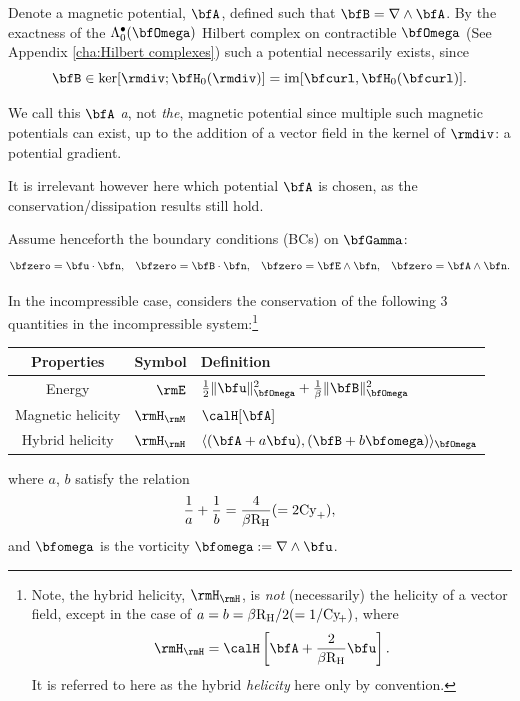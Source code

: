     Denote a magnetic potential, $\bfA$, defined such that $\bfB  =  \nabla\wedge\bfA$. By the exactness of the $\Lambda_{0}^{\bullet}(\bfOmega)$ Hilbert complex on contractible $\bfOmega$ (See Appendix \ref{cha:Hilbert complexes}) such a potential necessarily exists, since
    \begin{equation}
        \bfB  \in  \ker[\rmdiv; \bfH_{0}(\rmdiv)]  =  \im[\bfcurl, \bfH_{0}(\bfcurl)].
    \end{equation}
    
    \begin{remark}
        We call this $\bfA$ \emph{a}, not \emph{the}, magnetic potential since multiple such magnetic potentials can exist, up to the addition of a vector field in the kernel of $\rmdiv$: a potential gradient.
        
        It is irrelevant however here which potential $\bfA$ is chosen, as the conservation/dissipation results still hold.
    \end{remark}

    Assume henceforth the boundary conditions (BCs) on $\bfGamma$: 
    \begin{align}\label{eqn:canonical boundary conditions}
        \bfzero  =  \bfu\cdot\bfn,   &&
        \bfzero  =  \bfB\cdot\bfn,   &&
        \bfzero  =  \bfE\wedge\bfn,  &&
        \bfzero  =  \bfA\wedge\bfn.
    \end{align}

    In the incompressible case, \cite{Laakmann_Hu_Farrell_2022} considers the conservation of the following 3 quantities in the incompressible system:\footnote{Note, the hybrid helicity, $\rmH_{\rmH}$, is \emph{not} (necessarily) the helicity of a vector field, except in the case of $a = b = \beta\mathrm{R}_{\mathrm{H}}/2 (= 1/\mathrm{Cy}\!_{+})$, where
    \begin{equation}
        \rmH_{\rmH} = \calH\left[\bfA + \frac{2}{\beta\rmRH}\bfu\right].
    \end{equation}
    It is referred to here as the hybrid \emph{helicity} here only by convention.}
    \begin{center}\begin{tabular}{ c | r : l }
        Properties  &  Symbol  &  Definition  \\
        \hline\hline
        Energy  &  $\rmE$  &  $\frac{1}{2}\|\bfu\|_{\bfOmega}^{2} + \frac{1}{\beta}\|\bfB\|_{\bfOmega}^{2}$  \\
        \hdashline
        Magnetic helicity \cite{Blackman_2015}  &  $\rmH_{\rmM}$  &  $\calH[\bfA]$  \\
        Hybrid helicity \cite{Subramanian_Brandenburg_2006}  &  $\rmH_{\rmH}$  &  $\langle(\bfA + a\bfu), (\bfB + b\bfomega)\rangle_{\bfOmega}$
    \end{tabular}\end{center}
    where $a$, $b$ satisfy the relation
    \begin{equation}
        \frac{1}{a} + \frac{1}{b}  =  \frac{4}{\beta\mathrm{R}_{\mathrm{H}}}  (=  2\mathrm{Cy}_{+}),
    \end{equation}
    and $\bfomega$ is the vorticity $\bfomega  :=  \nabla\wedge\bfu$.
    
